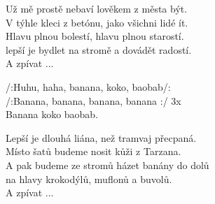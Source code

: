 
\ve{}
Už mě prostě nebaví lověkem z města být.\\
V týhle kleci z betónu, jako všichni lidé ít.\\
Hlavu plnou bolestí, hlavu plnou starostí.\\
lepší je bydlet na stromě a dovádět radostí.\\
A zpívat ...

\cho{}
/:Huhu, haha, banana, koko, baobab/:\\
/:Banana, banana, banana, banana :/ 3x\\
Banana koko baobab.

\ve{}
Lepší je dlouhá liána, než tramvaj přecpaná.\\
Místo šatů budeme nosit kůži z Tarzana.\\
A pak budeme ze stromů házet banány do dolů\\
na hlavy krokodýlů, muflonů a buvolů.\\
A zpívat ... 

\cho{} 

\esong{}
